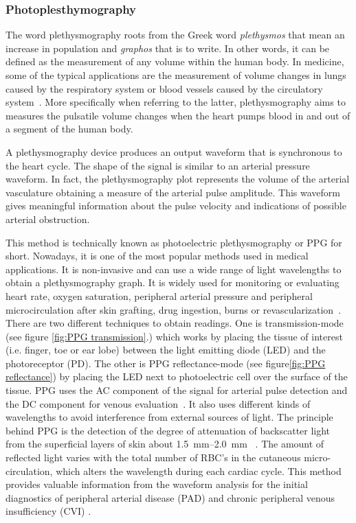\subsubsection{Photoplesthymography}
\label{section literature PPG}
The word plethysmography roots from the Greek word \textit{plethysmos} that mean an increase in population and \textit{graphos} that is to write. In other words, it can be defined as the measurement of any volume within the human body. In medicine, some of the typical applications are the measurement of volume changes in lungs caused by the respiratory system or blood vessels caused by the circulatory system~\cite{turcott2004methods}. More specifically when referring to the latter, plethysmography aims to measures the pulsatile volume changes when the heart pumps blood in and out of a segment of the human body. 

A plethysmography device produces an output waveform that is synchronous to the heart cycle. The shape of the signal is similar to an arterial pressure waveform. In fact, the plethysmography plot represents the volume of the arterial vasculature obtaining a measure of the arterial pulse amplitude. This waveform gives meaningful information about the pulse velocity and indications of possible arterial obstruction.

This method is technically known as photoelectric plethysmography or PPG for short. Nowadays, it is one of the most popular methods used in medical applications. It is non-invasive and can use a wide range of light wavelengths to obtain a plethysmography graph. It is widely used for monitoring or evaluating heart rate, oxygen saturation, peripheral arterial pressure and peripheral microcirculation after skin grafting, drug ingestion, burns or revascularization~\cite{holohan1996plethysmography}. There are two different techniques to obtain readings. One is transmission-mode (see figure \ref{fig:PPG transmission}.) which works by placing the tissue of interest (i.e. finger, toe or ear lobe) between the light emitting diode (LED) and the photoreceptor (PD). The other is PPG reflectance-mode (see figure\ref{fig:PPG reflectance}) by placing the LED next to photoelectric cell over the surface of the tissue. PPG uses the AC component of the signal for arterial pulse detection and the DC component for venous evaluation~\cite{higgins1986photoplethysmographic}. It also uses different kinds of wavelengths to avoid interference from external sources of light. The principle behind PPG is the detection of the degree of attenuation of backscatter light from the superficial layers of skin about \SIrange{1.5}{2.0}{\milli\meter} ~\cite{holohan1996plethysmography,kim1986pulse,bashkatov2005optical}. The amount of reflected light varies with the total number of RBC’s in the cutaneous micro-circulation, which alters the wavelength during each cardiac cycle. This method provides valuable information from the waveform analysis for the initial diagnostics of peripheral arterial disease (PAD) \cite{allen1993development, williams2005evaluation, alnaeb2007optical} and chronic peripheral venous insufficiency (CVI) \cite{eberhardt2005chronic,norris1983quantitative}.


